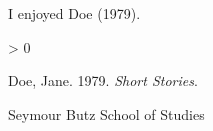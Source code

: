 
%
%
\newlength{\cslhangindent}
\setlength{\cslhangindent}{1.5em}
\newlength{\csllabelwidth}
\setlength{\csllabelwidth}{3em}
\newenvironment{CSLReferences}[2] %
 {%
  \setlength{\parindent}{0pt}
  \ifodd #1 \everypar{\setlength{\hangindent}{\cslhangindent}}\ignorespaces\fi
  \ifnum #2 > 0
  \setlength{\parskip}{#2\baselineskip}
  \fi
 }%
 {}
\usepackage{calc}
\newcommand{\CSLBlock}[1]{#1\hfill\break}
\newcommand{\CSLLeftMargin}[1]{\parbox[t]{\csllabelwidth}{#1}}
\newcommand{\CSLRightInline}[1]{\parbox[t]{\linewidth - \csllabelwidth}{#1}\break}
\newcommand{\CSLIndent}[1]{\hspace{\cslhangindent}#1}



I enjoyed Doe (1979).

\hypertarget{refs}{}
\begin{CSLReferences}{1}{0}
\leavevmode\hypertarget{ref-Doe}{}%
Doe, Jane. 1979. \emph{Short Stories}.

\end{CSLReferences}

Seymour Butz
School of Studies





